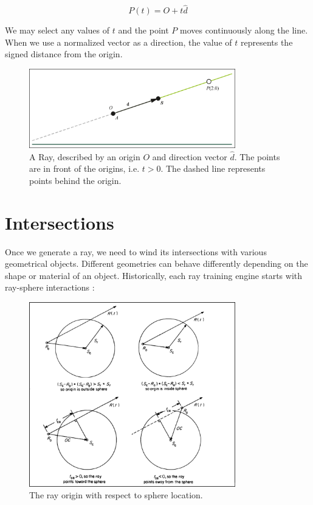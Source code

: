 \documentclass[12pt,a4paper,english]{article}
\begin{document}
\begin{equation}
    P(t) = O + t \hat{d}
\end{equation}

We may select any values of $t$ and the point $P$ moves continuously along the line. When we use a normalized vector as a direction, the value of $t$ represents the signed distance from the origin.

\begin{figure}[H]
    \centering
    \includegraphics[width=0.8\textwidth]{ray_gems}
    \caption[]{A Ray, described by an origin $O$ and direction vector $\hat{d}$. The points are in front of the origins, i.e. $t > 0$. The dashed line represents points behind the origin.}
    \label{fig:ray_gems}
\end{figure}

\section{Intersections}

Once we generate a ray, we need to wind its intersections with various geometrical objects. Different geometries can behave differently depending on the shape or material of an object. Historically, each ray training engine starts with ray-sphere interactions \cite{Haines_1989}:

\begin{figure}[H]
    \centering
    \includegraphics[width=0.8\textwidth]{ray-sphere-haines-89}
    \caption[]{The ray origin with respect to sphere location.}
    \label{fig:ray-sphere-haines-89}
\end{figure}
\end{document}
